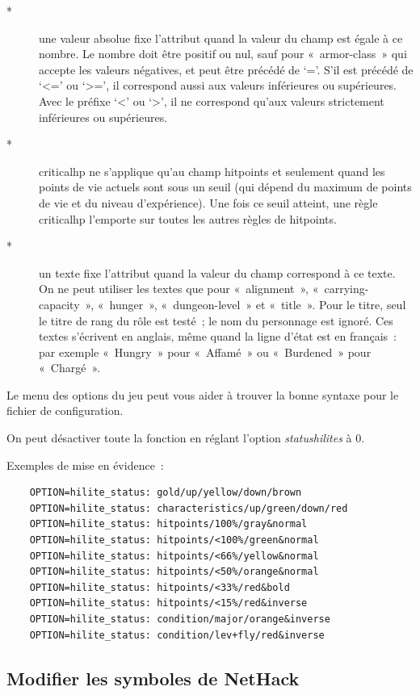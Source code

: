 \documentclass[titlepage]{article}
\begin{document}
\begin{description}
\item[{*}]
une valeur absolue fixe l'attribut quand la valeur du champ est égale à ce
nombre.
Le nombre doit être positif ou nul, sauf pour «~armor-class~» qui
accepte les valeurs négatives, et peut être précédé de `='.
S'il est précédé de `\textless{}=' ou `\textgreater{}=', il correspond aussi aux
valeurs inférieures ou supérieures.
Avec le préfixe `\textless{}' ou `\textgreater{}', il ne correspond qu'aux valeurs
strictement inférieures ou supérieures.

\item[{*}]
criticalhp ne s'applique qu'au champ hitpoints et seulement quand les
points de vie actuels sont sous un seuil (qui dépend du maximum de points
de vie et du niveau d'expérience).
Une fois ce seuil atteint, une règle criticalhp l'emporte sur toutes les
autres règles de hitpoints.

\item[{*}]
un texte fixe l'attribut quand la valeur du champ correspond à ce texte.
On ne peut utiliser les textes que pour «~alignment~»,
«~carrying-capacity~», «~hunger~»,
«~dungeon-level~» et «~title~».
Pour le titre, seul le titre de rang du rôle est testé~; le nom du
personnage est ignoré.
Ces textes s'écrivent en anglais, même quand la ligne d'état est en
français~: par exemple «~Hungry~» pour «~Affamé~» ou
«~Burdened~» pour «~Chargé~».

\end{description}

Le menu des options du jeu peut vous aider à trouver la bonne syntaxe pour
le fichier de configuration.


On peut désactiver toute la fonction en réglant l'option
\textit{statushilites}
à 0.


Exemples de mise en évidence~:
\begin{verbatim}
    OPTION=hilite_status: gold/up/yellow/down/brown
    OPTION=hilite_status: characteristics/up/green/down/red
    OPTION=hilite_status: hitpoints/100%/gray&normal
    OPTION=hilite_status: hitpoints/<100%/green&normal
    OPTION=hilite_status: hitpoints/<66%/yellow&normal
    OPTION=hilite_status: hitpoints/<50%/orange&normal
    OPTION=hilite_status: hitpoints/<33%/red&bold
    OPTION=hilite_status: hitpoints/<15%/red&inverse
    OPTION=hilite_status: condition/major/orange&inverse
    OPTION=hilite_status: condition/lev+fly/red&inverse
\end{verbatim}
\medskip

\subsection{Modifier les symboles de NetHack}
\end{document}
